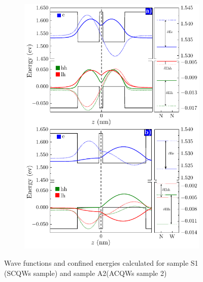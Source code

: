 \begin{figure}
	\centering
\begin{subfigure}{\textwidth}
	\includegraphics[width=\textwidth]{../figures/chapter-2/numerical-calculations/out/numerical-results-model.pdf}%
	\label{fig:chapter-2-sec-anisotropy-model-results-a}
	\label{fig:chapter-2-sec-anisotropy-model-results-b}
\end{subfigure}
	\caption{Wave functions and confined energies calculated for  sample S1 (SCQWs sample)  and  sample A2(ACQWs sample 2)}
	\label{fig:chapter-2-sec-anisotropy-model-results}
\end{figure}

